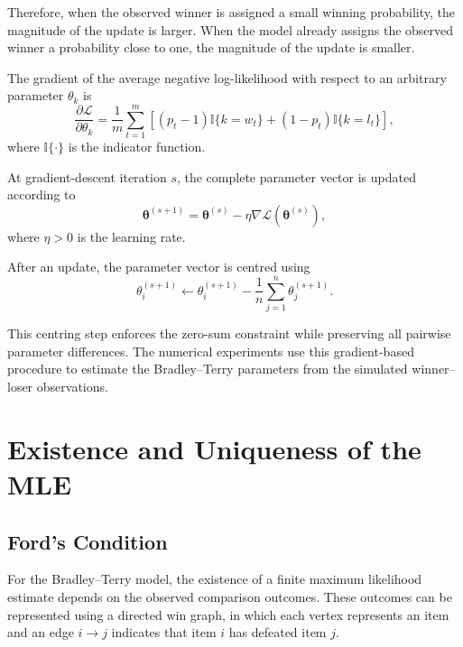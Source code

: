 \documentclass[12pt,oneside]{report}
\begin{document}
Therefore, when the observed winner is assigned a small winning
probability, the magnitude of the update is larger. When the model
already assigns the observed winner a probability close to one, the
magnitude of the update is smaller.

The gradient of the average negative log-likelihood with respect to an
arbitrary parameter \(\theta_k\) is
\begin{equation}
    \frac{\partial\mathcal{L}}
    {\partial\theta_k}
    =
    \frac{1}{m}
    \sum_{t=1}^{m}
    \left[
        (p_t-1)\mathbb{I}\{k=w_t\}
        +
        (1-p_t)\mathbb{I}\{k=l_t\}
    \right],
    \label{eq:btl-full-gradient}
\end{equation}
where \(\mathbb{I}\{\cdot\}\) is the indicator function.

At gradient-descent iteration \(s\), the complete parameter vector is
updated according to
\begin{equation}
    \boldsymbol{\theta}^{(s+1)}
    =
    \boldsymbol{\theta}^{(s)}
    -
    \eta
    \nabla
    \mathcal{L}
    \left(
        \boldsymbol{\theta}^{(s)}
    \right),
    \label{eq:btl-gradient-descent-update}
\end{equation}
where \(\eta>0\) is the learning rate.

After an update, the parameter vector is centred using
\begin{equation}
    \theta_i^{(s+1)}
    \leftarrow
    \theta_i^{(s+1)}
    -
    \frac{1}{n}
    \sum_{j=1}^{n}
    \theta_j^{(s+1)}.
    \label{eq:btl-gradient-centring}
\end{equation}

This centring step enforces the zero-sum constraint while preserving all
pairwise parameter differences. The numerical experiments use this
gradient-based procedure to estimate the Bradley--Terry parameters from
the simulated winner--loser observations.

\section{Existence and Uniqueness of the MLE}

\subsection{Ford's Condition}

For the Bradley--Terry model, the existence of a finite maximum
likelihood estimate depends on the observed comparison outcomes.
These outcomes can be represented using a directed win graph, in which
each vertex represents an item and an edge \(i\to j\) indicates that
item \(i\) has defeated item \(j\).
\end{document}
